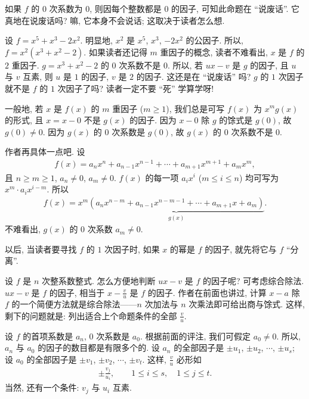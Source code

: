 \begin{remark}
    如果 $f$ 的 $0$ 次系数为 $0$, 则因每个整数都是 $0$ 的因子, 可知此命题在 ``说废话''. 它真地在说废话吗? 嘛, 它本身不会说话; 这取决于读者怎么想.

    设 $f = x^5 + x^3 - 2x^2$. 明显地, $x^2$ 是 $x^5$, $x^3$, $-2x^2$ 的公因子. 所以, $f = x^2 (x^3 + x^2 - 2)$. 如果读者还记得 $m$ 重因子的概念, 读者不难看出, $x$ 是 $f$ 的 $2$ 重因子. $g = x^3 + x^2 - 2$ 的 $0$ 次系数不是 $0$. 所以, 若 $ux - v$ 是 $g$ 的因子, 且 $u$ 与 $v$ 互素, 则 $u$ 是 $1$ 的因子, $v$ 是 $2$ 的因子. 这还是在 ``说废话'' 吗? $g$ 的 $1$ 次因子就不是 $f$ 的 $1$ 次因子了吗? 读者一定不要 ``死'' 学算学呀!

    一般地, 若 $x$ 是 $f(x)$ 的 $m$ 重因子 ($m \geq 1$), 我们总是可写 $f(x)$ 为 $x^m g(x)$ 的形式, 且 $x = x - 0$ 不是 $g(x)$ 的因子. 因为 $x - 0$ 除 $g$ 的馀式是 $g(0)$, 故 $g(0) \neq 0$. 因为 $g(x)$ 的 $0$ 次系数是 $g(0)$, 故 $g(x)$ 的 $0$ 次系数不是 $0$.

    作者再具体一点吧. 设
    \begin{align*}
        f(x) = a_n x^n + a_{n-1} x^{n-1} + \cdots + a_{m+1} x^{m+1} + a_m x^m,
    \end{align*}
    且 $n \geq m \geq 1$, $a_n \neq 0$, $a_m \neq 0$. $f(x)$ 的每一项 $a_i x^i$ ($m \leq i \leq n$) 均可写为 $x^m \cdot a_i x^{i-m}$. 所以
    \begin{align*}
        f(x) = x^m \underbrace{(a_n x^{n-m} + a_{n-1} x^{n-m-1} + \cdots + a_{m+1} x + a_m)}_{g(x)}.
    \end{align*}
    不难看出, $g(x)$ 的 $0$ 次系数 $a_m \neq 0$.

    以后, 当读者要寻找 $f$ 的 $1$ 次因子时, 如果 $x$ 的幂是 $f$ 的因子, 就先将它与 $f$ ``分离''.
\end{remark}

设 $f$ 是 $n$ 次整系数整式. 怎么方便地判断 $ux - v$ 是 $f$ 的因子呢? 可考虑综合除法. $ux - v$ 是 $f$ 的因子, 相当于 $x - \frac{v}{u}$ 是 $f$ 的因子. 作者在前面也讲过, 计算 $x - a$ 除 $f$ 的一个简便方法就是综合除法——$n$ 次加法与 $n$ 次乘法即可给出商与馀式. 这样, 剩下的问题就是: 列出适合上个命题条件的全部 $\frac{v}{u}$.

设 $f$ 的首项系数是 $a_n$, $0$ 次系数是 $a_0$. 根据前面的评注, 我们可假定 $a_0 \neq 0$. 所以, $a_n$ 与 $a_0$ 的因子的数目都是有限多个的. 设 $a_n$ 的全部因子是 $\pm u_1$, $\pm u_2$, $\cdots$, $\pm u_s$; 设 $a_0$ 的全部因子是 $\pm v_1$, $\pm v_2$, $\cdots$, $\pm v_t$. 这样, $\frac{v}{u}$ 必形如
\begin{align*}
    \pm \frac{v_j}{u_i}, \qquad 1 \leq i \leq s, \quad 1 \leq j \leq t.
\end{align*}
当然, 还有一个条件: $v_j$ 与 $u_i$ 互素.

